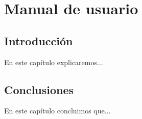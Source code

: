 \chapter{Manual de usuario}\label{cap:manual}

\section{Introducción}
En este capítulo explicaremos...

\section{Conclusiones}
En este capítulo concluimos que...